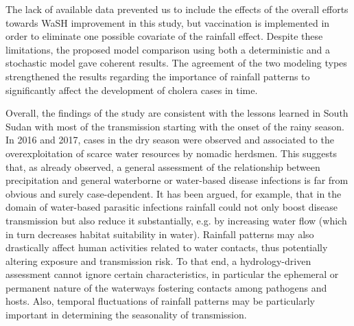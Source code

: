 The lack of available data prevented us to include the effects of the overall efforts towards WaSH improvement in this study, but vaccination is implemented in order to eliminate one possible covariate of the rainfall effect. 
Despite these limitations, the proposed model comparison using both a deterministic and a stochastic model gave coherent results. The agreement of the two modeling types strengthened the results regarding the importance of rainfall patterns to significantly affect the development of cholera cases in time.

Overall, the findings of the study are consistent with the lessons learned in South Sudan with most of the transmission starting with the onset of the rainy season. In 2016 and 2017, cases in the dry season were observed and associated to the overexploitation of scarce water resources by nomadic herdsmen. This suggests that, as already observed, a general assessment of the relationship between precipitation and general waterborne or water-based disease infections is far from obvious and surely case-dependent. It has been argued, for example, that in the domain of water-based parasitic infections rainfall could not only boost disease transmission but also reduce it substantially\cite[-12\baselineskip]{McCreesh:ChallengesPredictingEffects:2013}, e.g. by increasing water flow (which in turn decreases habitat suitability in water). Rainfall patterns may also drastically affect human activities related to water contacts, thus potentially altering exposure and transmission risk\cite{Lai:SpatialDistributionSchistosomiasis:2015}. To that end, a hydrology-driven assessment cannot ignore certain characteristics, in particular the ephemeral or permanent nature of the waterways fostering contacts among pathogens and hosts\cite{Perez-Saez:HydrologyDensityFeedbacks:2016}. Also, temporal fluctuations of rainfall patterns may be particularly important in determining the seasonality of transmission\cite{Bertuzzo:HydroclimatologyDualpeakAnnual:2012,Bertuzzo:PredictionSpatialEvolution:2011,McCreesh:PredictingEffectsClimate:2015,Perez-Saez:HydrologyDensityFeedbacks:2016}.



